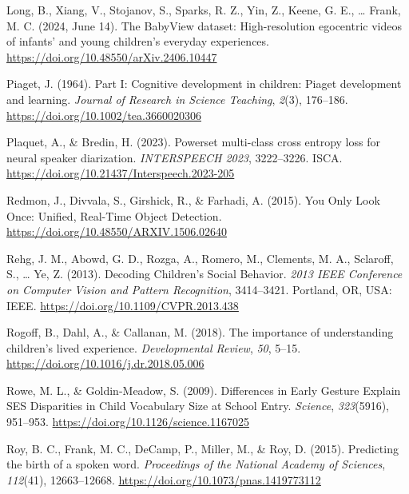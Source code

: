 \documentclass[
  man,floatsintext]{apa6}
\newlength{\cslhangindent}
\newenvironment{CSLReferences}[2] %
 {\begin{list}{}{%
  \setlength{\itemindent}{0pt}
  \setlength{\leftmargin}{0pt}
  \setlength{\parsep}{0pt}
  \ifodd #1
   \setlength{\leftmargin}{\cslhangindent}
   \setlength{\itemindent}{-1\cslhangindent}
  \fi
  \setlength{\itemsep}{#2\baselineskip}}}
 {\end{list}}
\begin{document}
\begin{CSLReferences}{1}{0}
Long, B., Xiang, V., Stojanov, S., Sparks, R. Z., Yin, Z., Keene, G. E., \ldots{} Frank, M. C. (2024, June 14). The {BabyView} dataset: {High-resolution} egocentric videos of infants' and young children's everyday experiences. \url{https://doi.org/10.48550/arXiv.2406.10447}

Piaget, J. (1964). Part {I}: {Cognitive} development in children: {Piaget} development and learning. \emph{Journal of Research in Science Teaching}, \emph{2}(3), 176--186. \url{https://doi.org/10.1002/tea.3660020306}

Plaquet, A., \& Bredin, H. (2023). Powerset multi-class cross entropy loss for neural speaker diarization. \emph{{INTERSPEECH} 2023}, 3222--3226. ISCA. \url{https://doi.org/10.21437/Interspeech.2023-205}

Redmon, J., Divvala, S., Girshick, R., \& Farhadi, A. (2015). You {Only Look Once}: {Unified}, {Real-Time Object Detection}. \url{https://doi.org/10.48550/ARXIV.1506.02640}

Rehg, J. M., Abowd, G. D., Rozga, A., Romero, M., Clements, M. A., Sclaroff, S., \ldots{} Ye, Z. (2013). Decoding {Children}'s {Social Behavior}. \emph{2013 {IEEE Conference} on {Computer Vision} and {Pattern Recognition}}, 3414--3421. Portland, OR, USA: IEEE. \url{https://doi.org/10.1109/CVPR.2013.438}

Rogoff, B., Dahl, A., \& Callanan, M. (2018). The importance of understanding children's lived experience. \emph{Developmental Review}, \emph{50}, 5--15. \url{https://doi.org/10.1016/j.dr.2018.05.006}

Rowe, M. L., \& Goldin-Meadow, S. (2009). Differences in {Early Gesture Explain SES Disparities} in {Child Vocabulary Size} at {School Entry}. \emph{Science}, \emph{323}(5916), 951--953. \url{https://doi.org/10.1126/science.1167025}

Roy, B. C., Frank, M. C., DeCamp, P., Miller, M., \& Roy, D. (2015). Predicting the birth of a spoken word. \emph{Proceedings of the National Academy of Sciences}, \emph{112}(41), 12663--12668. \url{https://doi.org/10.1073/pnas.1419773112}


\end{CSLReferences}
\end{document}
